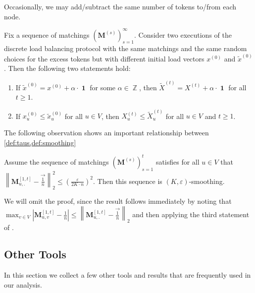 \documentclass[twoside,leqno]{article}
\DeclareMathOperator{\Z}{\mathbb{Z}}
\newcommand{\M}{\mathbf{M}}
\DeclareMathOperator{\1}{\mathbf{1}}
\numberwithin{equation}{section}
\let\epsilon\varepsilon
\begin{document}
Occasionally, we may add/subtract the same number of tokens to/from each node.
\begin{observation}\label{obs:subAdd}
Fix a sequence of matchings $\left(\M^{(s)}\right)_{s=1}^{\infty}$.
Consider two executions of the discrete load balancing protocol with the same matchings and the same random choices for the excess tokens but with different initial load vectors $x^{(0)}$ and $\widetilde{x}^{(0)}$. Then the following two statements hold:
\begin{enumerate}
\item If $\widetilde{x}^{(0)}=x^{(0)}+\alpha\cdot \1$ for some $\alpha\in \Z$, then $\widetilde{X}^{(t)}=X^{(t)} + \alpha\cdot \1$ for all $t\ge 1$.
\item If $x_u^{(0)} \le \widetilde{x}_u^{(0)}$ for all $u\in V$, then $X_u^{(t)} \le \widetilde{X}_u^{(t)}$ for all $u\in V$ and $t\ge 1$.
\end{enumerate}
\end{observation}

The following observation shows an important relationship between \cref{def:taus,def:smoothing} 

\begin{observation}
\label{obs:tauGtauCRelation}
Assume the sequence of matchings $\left(\M^{(s)}\right)_{s=1}^t$ satisfies for all
$u\in V$ that $\left\|\M_{u,.}^{[1,t]}-\vec{ \frac{1}{n} }\right\|_2^2 \le {\left(\frac{\epsilon}{2 K\cdot n}\right)^2}$.
Then this sequence is $(K,\epsilon)$-smoothing.
\end{observation}
We will omit the proof, since the result follows immediately 
by noting that $ \max_{v \in V} \left| \M_{u,v}^{[1,t]} - \frac{1}{n} \right| \leq \left\| \M_{u,.}^{[1,t]} - \vec{ \frac{1}{n} } \right\|_2 $ and then applying the third statement of \cite[Lemma 2.2]{DBLP:conf/focs/SauerwaldS12}. 


\subsection{Other Tools}

In this section we collect a few other tools and results that are frequently used in our analysis.
\end{document}
